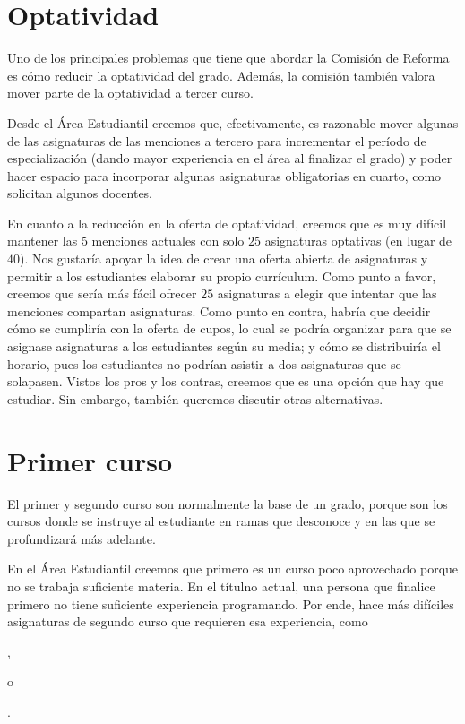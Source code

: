
\section{Optatividad}

Uno de los principales problemas que tiene que abordar
la Comisión de Reforma
es cómo reducir la optatividad del grado. %
Además, la comisión también valora mover parte de la optatividad a tercer curso.

Desde el Área Estudiantil creemos que, efectivamente,
es razonable mover algunas de las asignaturas de las menciones a tercero para
incrementar el período de especialización
(dando mayor experiencia en el área al finalizar el grado)
y poder hacer espacio para
incorporar algunas asignaturas obligatorias en cuarto,
como solicitan algunos docentes.

En cuanto a la reducción en la oferta de optatividad,
creemos que es muy difícil mantener las $5$ menciones actuales
con solo $25$ asignaturas optativas (en lugar de $40$).
Nos gustaría apoyar la idea de crear una oferta abierta de asignaturas
y permitir a los estudiantes elaborar su propio currículum.
Como punto a favor, creemos que
sería más fácil ofrecer $25$ asignaturas a elegir
que intentar que las menciones compartan asignaturas.
Como punto en contra, habría que decidir
cómo se cumpliría con la oferta de cupos,
lo cual se podría organizar para que
se asignase asignaturas a los estudiantes según su media;
y cómo se distribuiría el horario,
pues los estudiantes no podrían asistir a dos asignaturas que se solapasen.
Vistos los pros y los contras, creemos que es una opción que hay que estudiar.
Sin embargo, también queremos discutir otras alternativas.

\section{Primer curso}\label{sec:approach-first-course}

El primer y segundo curso son normalmente la base de un grado,
porque son los cursos donde se instruye al estudiante en ramas que desconoce y
en las que se profundizará más adelante.

En el Área Estudiantil creemos que primero es un curso poco aprovechado
porque no se trabaja suficiente materia.
En el títulno actual, una persona que finalice primero
no tiene suficiente experiencia programando.
Por ende, hace más difíciles asignaturas de segundo curso
que requieren esa experiencia, como
\subject{Algoritmos y Estructuras de Datos},
\subject{Programación Orientada a Objetos} o
\subject{Programación Concurrente y Distribuida}.

